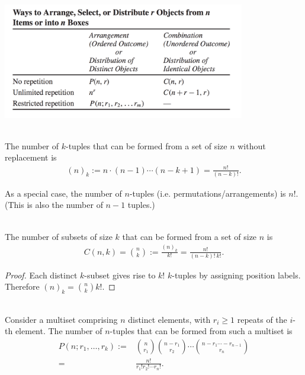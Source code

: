 \begin{mdframed}
\includegraphics[width=300pt]{img/discrete-mathematics-tucker-combinatorics-summary.png}
\end{mdframed}

\begin{theorem*}[Subtuples]~\\
  The number of $k$-tuples that can be formed from a set of size $n$ without replacement is
  \begin{align*}
    (n)_k := n \cdot (n-1) \cdots (n - k + 1) = \frac{n!}{(n-k)!}.
  \end{align*}
\end{theorem*}

\begin{remark*}
  As a special case, the number of $n$-tuples (i.e. permutations/arrangements) is $n!$. (This is also
  the number of $n-1$ tuples.)
\end{remark*}

\begin{theorem*}[Subsets]~\\
  The number of subsets of size $k$ that can be formed from a set of size $n$ is
  \begin{align*}
    C(n, k) = {n \choose k} := \frac{(n)_k}{k!} = \frac{n!}{(n-k)!~k!}.
  \end{align*}
\end{theorem*}

\begin{proof}
  Each distinct $k$-subset gives rise to $k!$ $k$-tuples by assigning position labels. Therefore
  $(n)_k = {n \choose k}k!$.
\end{proof}

\begin{theorem*}~\\
  Consider a multiset comprising $n$ distinct elements, with $r_i \geq 1$ repeats of the $i$-th
  element. The number of $n$-tuples that can be formed from such a multiset is
  \begin{align*}
    P(n; r_1, \ldots, r_k)
    :=& {n \choose r_1}{n - r_1 \choose r_2}\cdots{n - r_1 \cdots - r_{n-1} \choose r_n}\\
     =& \frac{n!}{r_1!r_2!\cdots r_n!}.
  \end{align*}
\end{theorem*}

